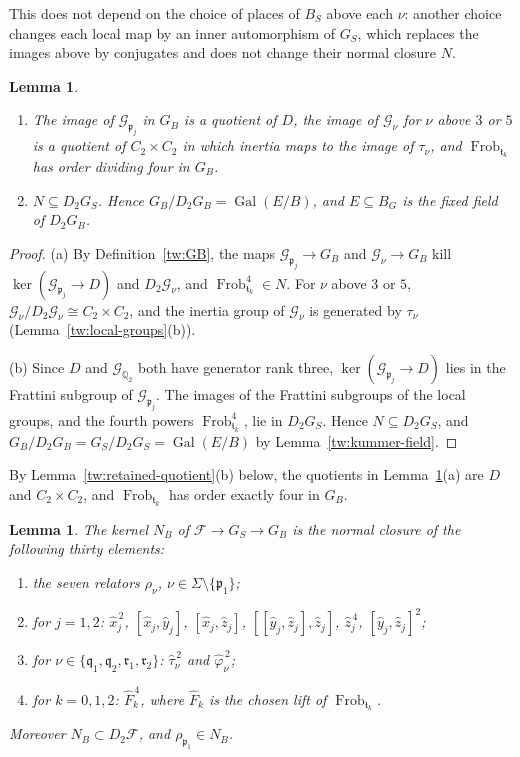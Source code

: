 \documentclass[11pt]{amsart}
\numberwithin{equation}{section}
\newtheorem{lemma}[equation]{Lemma}
\theoremstyle{definition}
\theoremstyle{remark}
\DeclareMathOperator{\Gal}{Gal}
\DeclareMathOperator{\Frob}{Frob}
\newcommand{\Q}{\mathbb Q}
\begin{document}
This does not depend on the choice of places of $B_S$ above each $\nu$:
another choice changes each local map by an inner automorphism of $G_S$,
which replaces the images above by conjugates and does not change their
normal closure $N$.

\begin{lemma}\label{tw:GB-basic}
\begin{enumerate}
\item[(a)] The image of $\mathcal G_{\mathfrak p_j}$ in $G_B$ is a quotient of
 $D$, the image of $\mathcal G_\nu$ for $\nu$ above $3$ or $5$ is a quotient of
 $C_2\times C_2$ in which inertia maps to the image of $\tau_\nu$, and
 $\Frob_{\mathfrak t_k}$ has order dividing four in $G_B$.
\item[(b)] $N\subseteq D_2G_S$. Hence $G_B/D_2G_B=\Gal(E/B)$, and $E\subseteq B_G$
 is the fixed field of $D_2G_B$.
\end{enumerate}
\end{lemma}

\begin{proof}
(a) By Definition~\ref{tw:GB}, the maps $\mathcal G_{\mathfrak p_j}\to G_B$
and $\mathcal G_\nu\to G_B$ kill $\ker(\mathcal G_{\mathfrak p_j}\to D)$ and
$D_2\mathcal G_\nu$, and $\Frob_{\mathfrak t_k}^4\in N$. For $\nu$ above $3$
or $5$, $\mathcal G_\nu/D_2\mathcal G_\nu\cong C_2\times C_2$, and the inertia
group of $\mathcal G_\nu$ is generated by $\tau_\nu$
(Lemma~\ref{tw:local-groups}(b)).

(b) Since $D$ and $\mathcal G_{\Q_2}$ both have generator rank three,
$\ker(\mathcal G_{\mathfrak p_j}\to D)$ lies in the Frattini subgroup of
$\mathcal G_{\mathfrak p_j}$. The images of the Frattini subgroups of the
local groups, and the fourth powers $\Frob_{\mathfrak t_k}^4$, lie in
$D_2G_S$. Hence $N\subseteq D_2G_S$, and $G_B/D_2G_B=G_S/D_2G_S=\Gal(E/B)$ by
Lemma~\ref{tw:kummer-field}.
\end{proof}

By Lemma~\ref{tw:retained-quotient}(b) below, the quotients in
Lemma~\ref{tw:GB-basic}(a) are $D$ and $C_2\times C_2$, and
$\Frob_{\mathfrak t_k}$ has order exactly four in $G_B$.

\begin{lemma}\label{tw:GB-presentation}
The kernel $N_B$ of $\mathcal F\to G_S\to G_B$ is the normal closure
of the following thirty elements:
\begin{enumerate}
\item[(i)] the seven relators $\rho_\nu$, $\nu\in\Sigma\setminus\{\mathfrak p_1\}$;
\item[(ii)] for $j=1,2$: $\hat x_j^{\,2}$, $[\hat x_j,\hat y_j]$,
 $[\hat x_j,\hat z_j]$, $[[\hat y_j,\hat z_j],\hat z_j]$, $\hat z_j^{\,4}$,
 $[\hat y_j,\hat z_j]^2$;
\item[(iii)] for $\nu\in\{\mathfrak q_1,\mathfrak q_2,\mathfrak r_1,\mathfrak r_2\}$:
 $\hat\tau_\nu^{\,2}$ and $\hat\varphi_\nu^{\,2}$;
\item[(iv)] for $k=0,1,2$: $\hat F_k^{\,4}$, where $\hat F_k$ is the chosen
 lift of $\Frob_{\mathfrak t_k}$.
\end{enumerate}
Moreover $N_B\subset D_2\mathcal F$, and $\rho_{\mathfrak p_1}\in N_B$.
\end{lemma}
\end{document}
